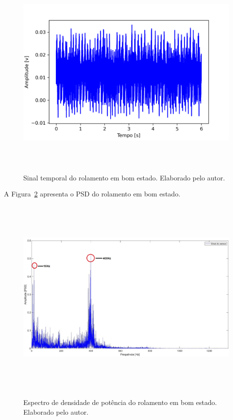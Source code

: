 \documentclass[
	12pt,				
	oneside,			
	a4paper,			
	english,			
	brazil,			
	]{abntex2ppgsi}
\begin{document}
{{{{{{{{{{{{{\begin{figure}[H]
\centering
\caption {Sinal temporal do rolamento em bom estado. Elaborado pelo autor.}
\includegraphics[width=\textwidth,height=100mm,keepaspectratio]{Caso1/DOMINIO_TEMPO_ROLAMENTO_BOM}
\label{DOMINIO_TEMPO_ROLAMENTO_BOM}
\end{figure} 


A Figura~\ref{PSD_ROLAMENTO_BOM} apresenta o PSD do rolamento em bom estado.

\begin{figure}[H]
\centering
\caption {Espectro de densidade de potência do rolamento em bom estado. Elaborado pelo autor.}
\includegraphics[width=\textwidth,height=100mm,keepaspectratio]{GraficosAnalise/PSD_ROLAMENTO_BOM}
\label{PSD_ROLAMENTO_BOM}
\end{figure} 

}}}}}}}}}}}}}
\end{document}

